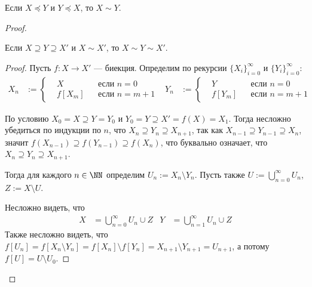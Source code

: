 \documentclass[12pt,a4paper]{article}
\begin{document}
    \begin{theorem}
        Если $X \preccurlyeq Y$ и $Y \preccurlyeq X$, то $X \sim Y$.
    \end{theorem}

    \begin{proof}
        \begin{thlemma}\label{CSB-th-lemma}
            Если $X \supseteq Y \supseteq X'$ и $X \sim X'$, то $X \sim Y \sim X'$.
        \end{thlemma}

        \begin{proof}
            Пусть $f: X \to X'$ --- биекция. Определим по рекурсии $\{X_i\}_{i=0}^\infty$ и $\{Y_i\}_{i=0}^\infty$:
            \begin{align*}
                X_n &:= \left\{\begin{aligned}
                    &X && \text{если $n = 0$}\\
                    &f[X_m] && \text{если $n=m+1$}
                \end{aligned}\right.&
                Y_n &:= \left\{\begin{aligned}
                    &Y && \text{если $n = 0$}\\
                    &f[Y_m] && \text{если $n=m+1$}
                \end{aligned}\right.
            \end{align*}

            По условию $X_0 = X \supseteq Y = Y_0$ и $Y_0 = Y \supseteq X' = f(X) = X_1$. Тогда несложно убедиться по индукции по $n$, что $X_n \supseteq Y_n \supseteq X_{n+1}$, так как $X_{n-1} \supseteq Y_{n-1} \supseteq X_n$, значит $f(X_{n-1}) \supseteq f(Y_{n-1}) \supseteq f(X_n)$, что буквально означает, что $X_n \supseteq Y_n \supseteq X_{n+1}$.

            Тогда для каждого $n \in \NN$ определим $U_n := X_n \setminus Y_n$. Пусть также $U := \bigcup_{n=0}^\infty U_n$, $Z := X \setminus U$.

            Несложно видеть, что
            \begin{align*}
                X &= \bigcup_{n=0}^\infty U_n \cup Z&
                Y &= \bigcup_{n=1}^\infty U_n \cup Z
            \end{align*}
            Также несложно видеть, что $f[U_n] = f[X_n \setminus Y_n] = f[X_n] \setminus f[Y_n] = X_{n+1} \setminus Y_{n+1} = U_{n+1}$, а потому $f[U] = U\setminus U_0$.


\end{proof}
\end{proof}
\end{document}
